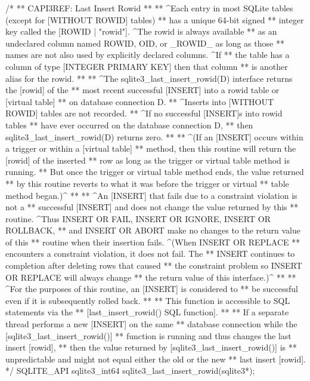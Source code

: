 \begin{Codex}[label=sqlite3.h,numbers=left]
{/*
** CAPI3REF: Last Insert Rowid
**
** ^Each entry in most SQLite tables (except for [WITHOUT ROWID] tables)
** has a unique 64-bit signed
** integer key called the [ROWID | "rowid"]. ^The rowid is always available
** as an undeclared column named ROWID, OID, or _ROWID_ as long as those
** names are not also used by explicitly declared columns. ^If
** the table has a column of type [INTEGER PRIMARY KEY] then that column
** is another alias for the rowid.
**
** ^The sqlite3_last_insert_rowid(D) interface returns the [rowid] of the 
** most recent successful [INSERT] into a rowid table or [virtual table]
** on database connection D.
** ^Inserts into [WITHOUT ROWID] tables are not recorded.
** ^If no successful [INSERT]s into rowid tables
** have ever occurred on the database connection D, 
** then sqlite3_last_insert_rowid(D) returns zero.
**
** ^(If an [INSERT] occurs within a trigger or within a [virtual table]
** method, then this routine will return the [rowid] of the inserted
** row as long as the trigger or virtual table method is running.
** But once the trigger or virtual table method ends, the value returned 
** by this routine reverts to what it was before the trigger or virtual
** table method began.)^
**
** ^An [INSERT] that fails due to a constraint violation is not a
** successful [INSERT] and does not change the value returned by this
** routine.  ^Thus INSERT OR FAIL, INSERT OR IGNORE, INSERT OR ROLLBACK,
** and INSERT OR ABORT make no changes to the return value of this
** routine when their insertion fails.  ^(When INSERT OR REPLACE
** encounters a constraint violation, it does not fail.  The
** INSERT continues to completion after deleting rows that caused
** the constraint problem so INSERT OR REPLACE will always change
** the return value of this interface.)^
**
** ^For the purposes of this routine, an [INSERT] is considered to
** be successful even if it is subsequently rolled back.
**
** This function is accessible to SQL statements via the
** [last_insert_rowid() SQL function].
**
** If a separate thread performs a new [INSERT] on the same
** database connection while the [sqlite3_last_insert_rowid()]
** function is running and thus changes the last insert [rowid],
** then the value returned by [sqlite3_last_insert_rowid()] is
** unpredictable and might not equal either the old or the new
** last insert [rowid].
*/
SQLITE_API sqlite3_int64 sqlite3_last_insert_rowid(sqlite3*);

}
\end{Codex}
